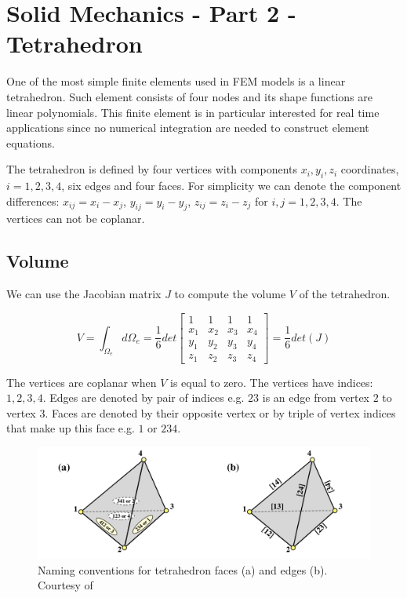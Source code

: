 \documentclass[en]{minipw} %
\begin{document}
\chapter{Solid Mechanics - Part 2 - Tetrahedron}
\label{chap:solid_mechanics2}

One of the most simple finite elements used in FEM models is a linear tetrahedron. Such element consists of four nodes and its shape functions are linear polynomials. This finite element is in particular interested for real time applications since no numerical integration are needed to construct element equations.

The tetrahedron is defined by four vertices with components $x_i, y_i, z_i$ coordinates, $i=1,2,3,4$, six edges and four faces. For simplicity we can denote the component differences: $x_{ij} = x_i - x_j$, $y_{ij} = y_i - y_j$, $z_{ij} = z_i - z_j$ for $i,j = 1,2,3,4$. The vertices can not be coplanar.

\section{Volume}

We can use the Jacobian matrix $J$ to compute the volume $V$ of the tetrahedron.

\begin{equation}
V = \int_{\Omega_{e}} d \Omega_{e} = \dfrac{1}{6} det
\begin{bmatrix}
1 & 1 & 1 & 1 \\
x_1 & x_2 & x_3 & x_4 \\
y_1 & y_2 & y_3 & y_4 \\
z_1 & z_2 & z_3 & z_4
\end{bmatrix}
= \dfrac{1}{6} det(J)
\end{equation}

The vertices are coplanar when $V$ is equal to zero. The vertices have indices: $1,2,3,4$. Edges are denoted by pair of indices e.g. $23$ is an edge from vertex $2$ to vertex $3$. Faces are denoted by their opposite vertex or by triple of vertex indices that make up this face e.g. $1$ or $234$.

\begin{figure}[h!]
\centering
\includegraphics[scale=0.5]{pictures/tetrahedron.png}
\caption[Tetrahedron Conventions]{Naming conventions for tetrahedron faces (a) and edges (b). Courtesy of~\cite{colorado_fem_lectures}}
\end{figure}
\end{document}
